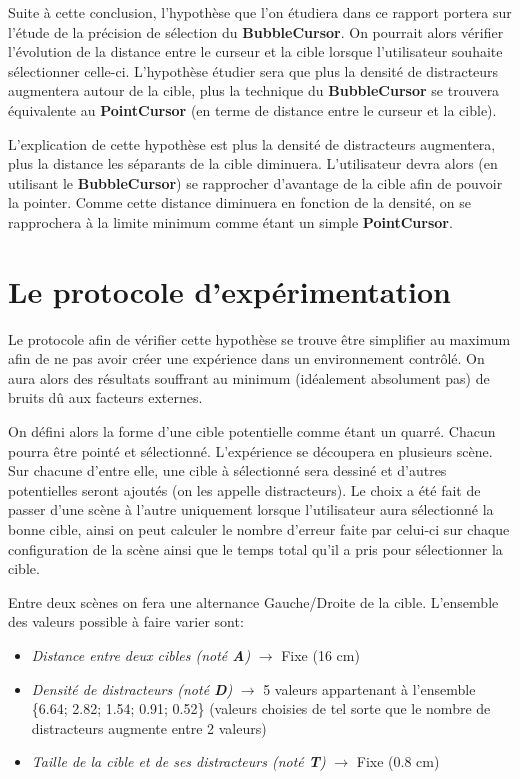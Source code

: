 \documentclass[a4paper, 12pt]{article}
\begin{document}
Suite à cette conclusion, l'hypothèse que l'on étudiera dans ce rapport portera sur l'étude de la précision de sélection du \textbf{BubbleCursor}. On pourrait alors vérifier l'évolution de la distance entre le curseur et la cible lorsque l'utilisateur souhaite sélectionner celle-ci. L'hypothèse étudier sera que plus la densité de distracteurs augmentera autour de la cible, plus la technique du \textbf{BubbleCursor} se trouvera équivalente au \textbf{PointCursor} (en terme de distance entre le curseur et la cible).

L'explication de cette hypothèse est plus la densité de distracteurs augmentera, plus la distance les séparants de la cible diminuera. L'utilisateur devra alors (en utilisant le \textbf{BubbleCursor}) se rapprocher d'avantage de la cible afin de pouvoir la pointer. Comme cette distance diminuera en fonction de la densité, on se rapprochera à la limite minimum comme étant un simple \textbf{PointCursor}.

\pagebreak
\section{Le protocole d'expérimentation}

Le protocole afin de vérifier cette hypothèse se trouve être simplifier au maximum afin de ne pas avoir créer une expérience dans un environnement contrôlé. On aura alors des résultats souffrant au minimum (idéalement absolument pas) de bruits dû aux facteurs externes.

On défini alors la forme d'une cible potentielle comme étant un quarré. Chacun pourra être pointé et sélectionné. L'expérience se découpera en plusieurs scène. Sur chacune d'entre elle, une cible à sélectionné sera dessiné et d'autres potentielles seront ajoutés (on les appelle distracteurs). Le choix a été fait de passer d'une scène à l'autre uniquement lorsque l'utilisateur aura sélectionné la bonne cible, ainsi on peut calculer le nombre d'erreur faite par celui-ci sur chaque configuration de la scène ainsi que le temps total qu'il a pris pour sélectionner la cible.

Entre deux scènes on fera une alternance Gauche/Droite de la cible. L'ensemble des valeurs possible à faire varier sont:

\begin{itemize}
    \item \textit{Distance entre deux cibles (noté \textbf{A})} $\rightarrow$ Fixe (16 cm) \\
    \item \textit{Densité de distracteurs (noté \textbf{D})} $\rightarrow$ 5 valeurs appartenant à l'ensemble \{6.64; 2.82; 1.54; 0.91; 0.52\} (valeurs choisies de tel sorte que le nombre de distracteurs augmente entre 2 valeurs) \\
    \item \textit{Taille de la cible et de ses distracteurs (noté \textbf{T})} $\rightarrow$ Fixe (0.8 cm)
\end{itemize}
\end{document}
